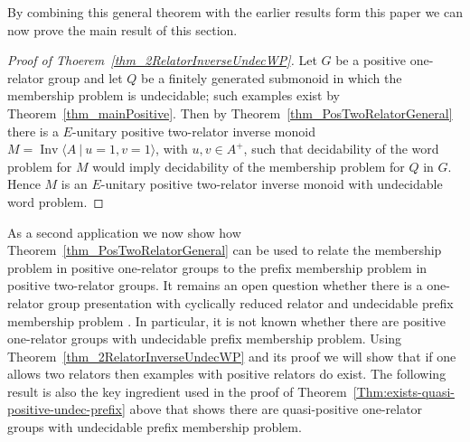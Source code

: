 \documentclass{amsart}
\newcommand{\Ipres}[2]{\operatorname{Inv}\bigl\langle #1\:|\:#2 \bigr\rangle}
\theoremstyle{plain}
\theoremstyle{definition}
\begin{document}
By combining this general theorem with the earlier results form this paper we can now prove the main result of this section. 

\begin{proof}[Proof of Thoerem~\ref{thm_2RelatorInverseUndecWP}]
Let $G$ be a positive one-relator group and let $Q$ be a finitely generated submonoid in which the membership problem is undecidable; such examples exist by Theorem~\ref{thm_mainPositive}. Then by Theorem~\ref{thm_PosTwoRelatorGeneral} there is a $E$-unitary positive two-relator inverse monoid 
$M=\Ipres{A}{u=1, v=1}$, with $u, v \in A^+$, such that decidability of the word problem for $M$ would imply decidability of the membership problem for $Q$ in $G$. Hence $M$ is an $E$-unitary positive two-relator inverse monoid with 
undecidable word problem.  
  \end{proof}

As a second application we now show how Theorem~\ref{thm_PosTwoRelatorGeneral} can be used to relate the membership problem in positive one-relator groups to the prefix membership problem in positive two-relator groups. 
It remains an open question whether there is a one-relator group presentation with cyclically reduced relator and undecidable prefix membership problem \cite[Question 13.10]{Bestvina2004}. In particular, it is not known whether there are positive one-relator groups with undecidable prefix membership problem.
Using Theorem~\ref{thm_2RelatorInverseUndecWP} and its proof we will show that if one allows two relators then examples with positive relators do exist. The following result is also the key ingredient used in the proof of Theorem~\ref{Thm:exists-quasi-positive-undec-prefix} above that shows there are quasi-positive one-relator groups with undecidable prefix membership problem.
 
\end{document}
